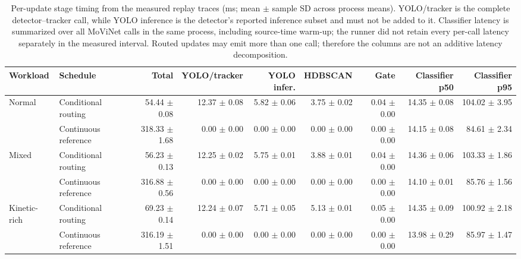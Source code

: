 \documentclass[9pt]{article}
\begin{document}
\begin{table}[ht]
\caption{Per-update stage timing from the measured replay traces (ms; mean $\pm$ sample SD across process means). YOLO/tracker is the complete detector--tracker call, while YOLO inference is the detector's reported inference subset and must not be added to it. Classifier latency is summarized over all MoViNet calls in the same process, including source-time warm-up; the runner did not retain every per-call latency separately in the measured interval. Routed updates may emit more than one call; therefore the columns are not an additive latency decomposition.}
\centering\scriptsize
\begin{tabular}{@{}llrrrrrrr@{}}
\toprule
Workload & Schedule & Total & YOLO/tracker & YOLO infer. & HDBSCAN & Gate & Classifier p50 & Classifier p95\\
\midrule
Normal & Conditional routing & 54.44 $\pm$ 0.08 & 12.37 $\pm$ 0.08 & 5.82 $\pm$ 0.06 & 3.75 $\pm$ 0.02 & 0.04 $\pm$ 0.00 & 14.35 $\pm$ 0.08 & 104.02 $\pm$ 3.95\\
 & Continuous reference & 318.33 $\pm$ 1.68 & 0.00 $\pm$ 0.00 & 0.00 $\pm$ 0.00 & 0.00 $\pm$ 0.00 & 0.00 $\pm$ 0.00 & 14.15 $\pm$ 0.08 & 84.61 $\pm$ 2.34\\
\addlinespace
Mixed & Conditional routing & 56.23 $\pm$ 0.13 & 12.25 $\pm$ 0.02 & 5.75 $\pm$ 0.01 & 3.88 $\pm$ 0.01 & 0.04 $\pm$ 0.00 & 14.36 $\pm$ 0.06 & 103.33 $\pm$ 1.86\\
 & Continuous reference & 316.88 $\pm$ 0.56 & 0.00 $\pm$ 0.00 & 0.00 $\pm$ 0.00 & 0.00 $\pm$ 0.00 & 0.00 $\pm$ 0.00 & 14.10 $\pm$ 0.01 & 85.76 $\pm$ 1.56\\
\addlinespace
Kinetic-rich & Conditional routing & 69.23 $\pm$ 0.14 & 12.24 $\pm$ 0.07 & 5.71 $\pm$ 0.05 & 5.13 $\pm$ 0.01 & 0.05 $\pm$ 0.00 & 14.35 $\pm$ 0.09 & 100.92 $\pm$ 2.18\\
 & Continuous reference & 316.19 $\pm$ 1.51 & 0.00 $\pm$ 0.00 & 0.00 $\pm$ 0.00 & 0.00 $\pm$ 0.00 & 0.00 $\pm$ 0.00 & 13.98 $\pm$ 0.29 & 85.97 $\pm$ 1.47\\
\bottomrule
\end{tabular}
\end{table}
\end{document}
